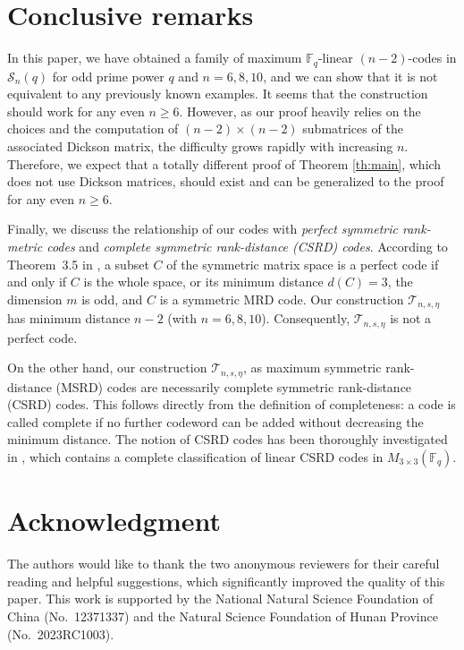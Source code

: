 \documentclass{amsart}
\theoremstyle{plain}
\theoremstyle{definition}
\newcommand{\fq}{\mathbb{F}_{q}}
\newcommand{\sS}{\mathscr S}
\begin{document}
	\section{Conclusive remarks}\label{sec:conclu}
	In this paper, we have obtained a family of maximum $\fq$-linear $(n-2)$-codes in $\sS_n(q)$ for odd prime power $q$ and $n=6,8,10$, and we can show that it is not equivalent to any previously known examples. It seems that the construction should work for any even $n\geq 6$. However, as our proof heavily relies on the choices and the computation of $(n-2)\times (n-2)$ submatrices of the associated Dickson matrix, the difficulty grows rapidly with increasing $n$. Therefore, we expect that a totally different proof of Theorem \ref{th:main}, which does not use Dickson matrices, should exist and can be generalized to the proof for any even $n\geq 6$.
	
	
	
	
	
		Finally, we discuss the relationship of our codes with \emph{perfect symmetric rank-metric codes} and \emph{complete symmetric rank-distance (CSRD) codes}. According to Theorem~3.5 in \cite{Mushrraf2024Perfect}, a subset \(C\) of the symmetric matrix space is a perfect code if and only if \(C\) is the whole space, or its minimum distance \(d(C)=3\), the dimension \(m\) is odd, and \(C\) is a symmetric MRD code. Our construction \(\mathcal{T}_{n,s,\eta}\) has minimum distance \(n-2\) (with \(n=6,8,10\)). Consequently, \(\mathcal{T}_{n,s,\eta}\) is not a perfect code.
		
		On the other hand, our construction \(\mathcal{T}_{n,s,\eta}\), as maximum symmetric rank-distance (MSRD) codes are necessarily  complete symmetric rank-distance (CSRD) codes. This follows directly from the definition of completeness: a code is called complete if no further codeword can be added without decreasing the minimum distance. The notion of CSRD codes has been thoroughly investigated in \cite{Alnajjarine2025Linear}, which contains a complete classification of linear CSRD codes in \(M_{3\times 3}(\mathbb{F}_{q})\).
	
	\section*{Acknowledgment}
	The authors would like to thank the two anonymous reviewers for their careful reading and helpful suggestions, which significantly improved the quality of this paper.
	This work is supported by the National Natural Science Foundation of China (No.\ 12371337) and the Natural Science Foundation of Hunan Province (No.\ 2023RC1003).
	
	 
\end{document}
